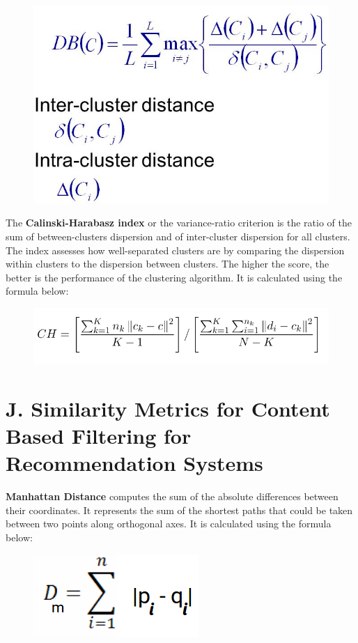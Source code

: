 \documentclass{article}
\begin{document}
\begin{figure}[H]
    \centering
    \includegraphics[width=0.5\linewidth]{Images/DB score.png}
\end{figure}

The \textbf{Calinski-Harabasz index} or the variance-ratio criterion is the ratio of the sum of between-clusters dispersion and of inter-cluster dispersion for all clusters. The index assesses how well-separated clusters are by comparing the dispersion within clusters to the dispersion between clusters. The higher the score, the better is the performance of the clustering algorithm. It is calculated using the formula below:

\begin{figure}[H]
    \centering
    \includegraphics[width=0.8\linewidth]{Images/calinski_harabasz.png}
\end{figure}

\clearpage
\section*{J. Similarity Metrics for Content Based Filtering for Recommendation Systems}

\textbf{Manhattan Distance} computes the sum of the absolute differences between their coordinates. It represents the sum of the shortest paths that could be taken between two points along orthogonal axes. It is calculated using the formula below:

\begin{figure}[H]
    \centering
    \includegraphics[width=0.25\linewidth]{Images/manhattan.png}
\end{figure}
\end{document}
